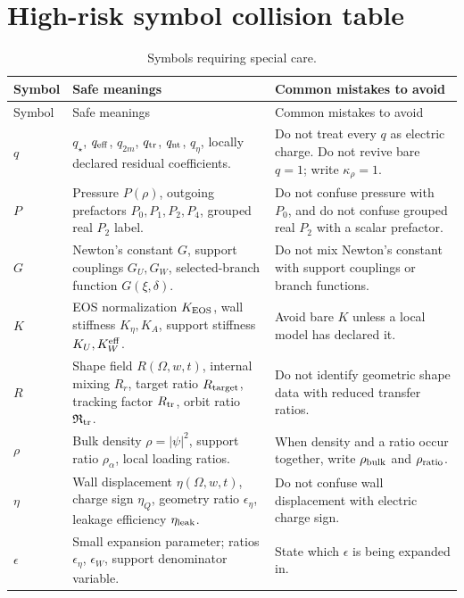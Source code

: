 \section{High-risk symbol collision table}
\label{sec:high-risk-symbol-table}

\begin{longtable}{L{0.13\textwidth}L{0.37\textwidth}L{0.41\textwidth}}
\caption{Symbols requiring special care.}\label{tab:high-risk-symbols}\\
\toprule
Symbol & Safe meanings & Common mistakes to avoid \\
\midrule
\endfirsthead
\toprule
Symbol & Safe meanings & Common mistakes to avoid \\
\midrule
\endhead
\(q\) & \(q_\star\), \(q_{\rm eff}\), \(q_{2m}\), \(q_{\rm tr}\), \(q_{\rm nt}\), \(q_\eta\), locally declared residual coefficients. & Do not treat every \(q\) as electric charge.  Do not revive bare \(q=1\); write \(\kappa_\rho=1\). \\
\addlinespace
\(P\) & Pressure \(P(\rho)\), outgoing prefactors \(P_0,P_1,P_2,P_4\), grouped real \(P_2\) label. & Do not confuse pressure with \(P_0\), and do not confuse grouped real \(P_2\) with a scalar prefactor. \\
\addlinespace
\(G\) & Newton's constant \(G\), support couplings \(G_U,G_W\), selected-branch function \(G(\xi,\delta)\). & Do not mix Newton's constant with support couplings or branch functions. \\
\addlinespace
\(K\) & EOS normalization \(K_{\rm EOS}\), wall stiffness \(K_\eta,K_A\), support stiffness \(K_U,K_W^{\rm eff}\). & Avoid bare \(K\) unless a local model has declared it. \\
\addlinespace
\(R\) & Shape field \(R(\Omega,w,t)\), internal mixing \(R_r\), target ratio \(R_{\rm target}\), tracking factor \(R_{\rm tr}\), orbit ratio \(\mathfrak R_{\rm tr}\). & Do not identify geometric shape data with reduced transfer ratios. \\
\addlinespace
\(\rho\) & Bulk density \(\rho=|\psi|^2\), support ratio \(\rho_\alpha\), local loading ratios. & When density and a ratio occur together, write \(\rho_{\rm bulk}\) and \(\rho_{\rm ratio}\). \\
\addlinespace
\(\eta\) & Wall displacement \(\eta(\Omega,w,t)\), charge sign \(\eta_Q\), geometry ratio \(\epsilon_\eta\), leakage efficiency \(\eta_{\rm leak}\). & Do not confuse wall displacement with electric charge sign. \\
\addlinespace
\(\epsilon\) & Small expansion parameter; ratios \(\epsilon_\eta\), \(\epsilon_W\), support denominator variable. & State which \(\epsilon\) is being expanded in. \\

\end{longtable}
